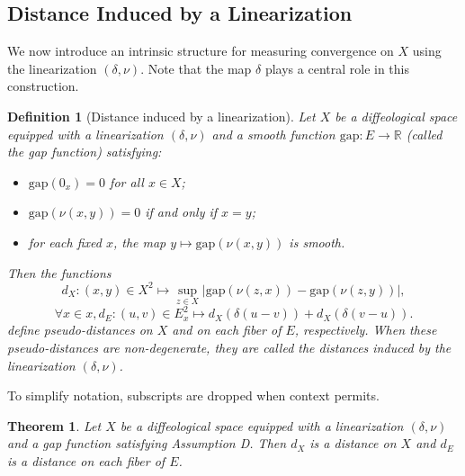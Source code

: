 \documentclass{amsart}
\newcounter{thm}
\newcounter{ex}
\newcounter{re}
\newtheorem{Theorem}[thm]{Theorem}
\newtheorem{Definition}[thm]{Definition}
\begin{document}
\subsection{Distance Induced by a Linearization}

We now introduce an intrinsic structure for measuring convergence on $X$ using the linearization $(\delta,\nu)$. Note that the map $\delta$ plays a central role in this construction.

{\color{black}
\begin{Definition}[Distance induced by a linearization]
Let \( X \) be a diffeological space equipped with a linearization \((\delta,\nu)\) and
a smooth function \( \mathrm{gap} : E \to \mathbb{R} \) (called the \emph{gap function})
satisfying:
\begin{itemize}
  \item[(i)] \( \mathrm{gap}(0_x) = 0 \) for all \( x \in X \);
  \item[(ii)] \( \mathrm{gap}(\nu(x,y)) = 0 \) if and only if \(x = y\);
  \item[(iii)] for each fixed \(x\), the map \(y \mapsto \mathrm{gap}(\nu(x,y))\) is smooth.
\end{itemize}
Then the functions
\[
  d_X: (x,y) \in X^2 \mapsto  \sup_{z \in X} \big| \mathrm{gap}(\nu(z,x)) - \mathrm{gap}(\nu(z,y)) \big|, \]
  \[
  \forall x \in x, d_E: (u,v) \in E_x^2 \mapsto   d_X(\delta(u - v)) + d_X(\delta(v - u)).
\]
define pseudo-distances on \(X\) and on each fiber of \(E\), respectively.
When these pseudo-distances are non-degenerate, they are called the
\emph{distances induced by the linearization} \((\delta,\nu)\).
\end{Definition}}
To simplify notation, subscripts are dropped when context permits.

\begin{Theorem}
	Let $X$ be a diffeological space equipped with a linearization $(\delta, \nu)$ and a gap function satisfying Assumption D. Then $d_X$ is a distance on $X$ and $d_E$ is a distance on each fiber of $E$.
\end{Theorem}
\end{document}
